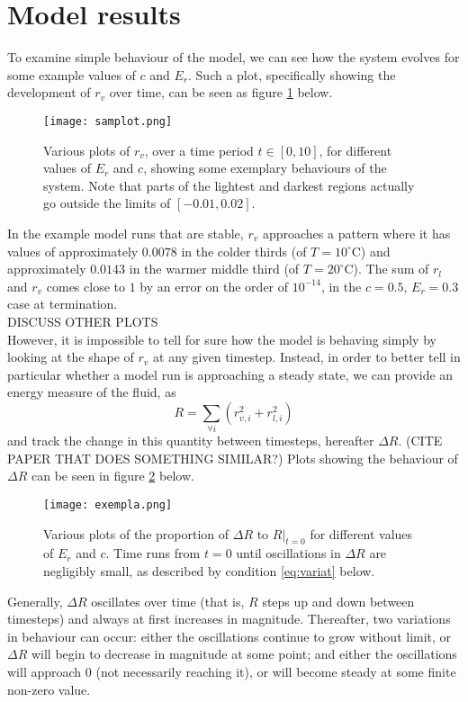 \documentclass[11pt]{article}
\begin{document}
\section{Model results}
To examine simple behaviour of the model, we can see how the system evolves for some example values of $c$ and $E_r$. Such a plot, specifically showing the development of $r_v$ over time, can be seen as figure \ref{fig:samplot} below.
\begin{figure}[H]
\centering
\texttt{[image: samplot.png]}
\caption{Various plots of $r_v$, over a time period $t\in[0,10]$, for different values of $E_r$ and $c$, showing some exemplary behaviours of the system. Note that parts of the lightest and darkest regions actually go outside the limits of $[-0.01,0.02]$.}
\label{fig:samplot}
\end{figure}
In the example model runs that are stable, $r_v$ approaches a pattern where it has values of approximately $0.0078$ in the colder thirds (of $T=10^{\circ}$C) and approximately $0.0143$ in the warmer middle third (of $T=20^{\circ}$C). The sum of $r_l$ and $r_v$ comes close to $1$ by an error on the order of $10^{-14}$, in the $c=0.5$, $E_r=0.3$ case at termination. \\
DISCUSS OTHER PLOTS \\
However, it is impossible to tell for sure how the model is behaving simply by looking at the shape of $r_v$ at any given timestep. Instead, in order to better tell in particular whether a model run is approaching a steady state, we can provide an energy measure of the fluid, as
\[
R = \sum_{\forall i}\left(r_{v,i}^2+r_{l,i}^2\right)
\]
and track the change in this quantity between timesteps, hereafter $\Delta R$. (CITE PAPER THAT DOES SOMETHING SIMILAR?) Plots showing the behaviour of $\Delta R$ can be seen in figure \ref{fig:exempla} below.
\begin{figure}[H]
\centering
\texttt{[image: exempla.png]}
\caption{Various plots of the proportion of $\Delta R$ to $R|_{t=0}$ for different values of $E_r$ and $c$. Time runs from $t=0$ until oscillations in $\Delta R$ are negligibly small, as described by condition \ref{eq:variat} below.}
\label{fig:exempla}
\end{figure}
Generally, $\Delta R$ oscillates over time (that is, $R$ steps up and down between timesteps) and always at first increases in magnitude. Thereafter, two variations in behaviour can occur: either the oscillations continue to grow without limit, or $\Delta R$ will begin to decrease in magnitude at some point; and either the oscillations will approach $0$ (not necessarily reaching it), or will become steady at some finite non-zero value. \\
\end{document}
